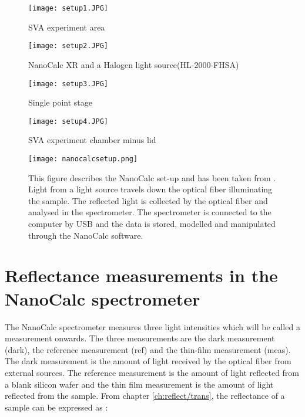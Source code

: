 \documentclass[MasterThesisMain.tex]{subfiles}
\begin{document}
	\begin{figure}[ht] 
	  \begin{minipage}[b]{0.5\linewidth}
	    \centering
	    \texttt{[image: setup1.JPG]} 
	    \caption{SVA experiment area}
	    \label{fig:exparea}  
	    \vspace{4ex}
	  \end{minipage}%
	  \begin{minipage}[b]{0.5\linewidth}
	    \centering
	    \texttt{[image: setup2.JPG]} 
	    \caption{NanoCalc XR and a Halogen light source(HL-2000-FHSA)}
	    \label{fig:speclight} 
	    \vspace{4ex}
	  \end{minipage} 
	  \begin{minipage}[b]{0.5\linewidth}
	    \centering
	    \texttt{[image: setup3.JPG]} 
	    \caption{Single point stage} 
	    \label{fig:Singlestage}
	    \vspace{4ex}
	  \end{minipage}%
	  \begin{minipage}[b]{0.5\linewidth}
	    \centering
	    \texttt{[image: setup4.JPG]} 
	    \caption{SVA experiment chamber minus lid}
	    \label{fig:SVAchamber} 
	    \vspace{4ex}
	  \end{minipage} 
	\end{figure}
	
	\begin{figure}
	\centering
		\texttt{[image: nanocalcsetup.png]}
		\caption{This figure describes the NanoCalc set-up and has been taken from \cite{nanocalcmanual}. Light from a light source travels down the optical fiber illuminating the sample. The reflected light is collected by the optical fiber and analysed in the spectrometer. The spectrometer is connected to the computer by USB and the data is stored, modelled and manipulated through the NanoCalc software.}
		\label{fig:nanocalcsetup}
	\end{figure}
	
\section{Reflectance measurements in the NanoCalc spectrometer}
The NanoCalc spectrometer measures three light intensities which will be called a measurement onwards. The three measurements are the dark measurement (dark), the reference measurement (ref) and the thin-film measurement (meas). The dark measurement is the amount of light received by the optical fiber from external sources. The reference measurement is the amount of light reflected from a blank silicon wafer and the thin film measurement is the amount of light reflected from the sample. From chapter \ref{ch:reflect/trans}, the reflectance of a sample can be expressed as :
\end{document}
